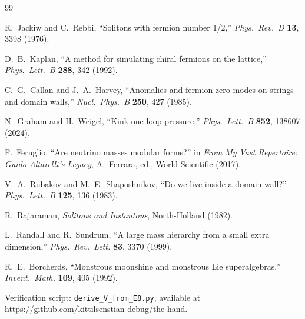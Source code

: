 \documentclass[11pt,a4paper]{article}
\begin{document}
\begin{thebibliography}{99}

R.~Jackiw and C.~Rebbi,
``Solitons with fermion number 1/2,''
\emph{Phys.\ Rev.\ D} \textbf{13}, 3398 (1976).

D.~B.~Kaplan,
``A method for simulating chiral fermions on the lattice,''
\emph{Phys.\ Lett.\ B} \textbf{288}, 342 (1992).

C.~G.~Callan and J.~A.~Harvey,
``Anomalies and fermion zero modes on strings and domain walls,''
\emph{Nucl.\ Phys.\ B} \textbf{250}, 427 (1985).

N.~Graham and H.~Weigel,
``Kink one-loop pressure,''
\emph{Phys.\ Lett.\ B} \textbf{852}, 138607 (2024).

F.~Feruglio,
``Are neutrino masses modular forms?''
in \emph{From My Vast Repertoire: Guido Altarelli's Legacy},
A.~Ferrara, ed., World Scientific (2017).

V.~A.~Rubakov and M.~E.~Shaposhnikov,
``Do we live inside a domain wall?''
\emph{Phys.\ Lett.\ B} \textbf{125}, 136 (1983).

R.~Rajaraman,
\emph{Solitons and Instantons}, North-Holland (1982).

L.~Randall and R.~Sundrum,
``A large mass hierarchy from a small extra dimension,''
\emph{Phys.\ Rev.\ Lett.} \textbf{83}, 3370 (1999).

R.~E.~Borcherds,
``Monstrous moonshine and monstrous Lie superalgebras,''
\emph{Invent.\ Math.} \textbf{109}, 405 (1992).

Verification script: \texttt{derive\_V\_from\_E8.py},
available at \url{https://github.com/kittilsenstian-debug/the-hand}.

\end{thebibliography}
\end{document}
